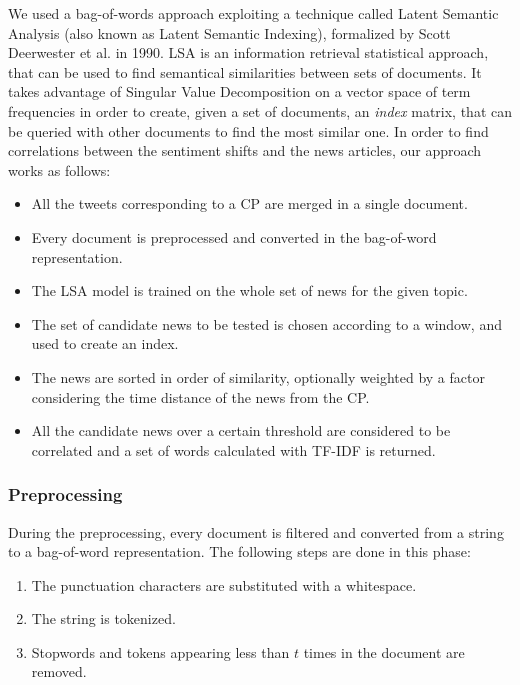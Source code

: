 We used a bag-of-words approach exploiting a technique called Latent Semantic Analysis (also known as Latent Semantic Indexing), formalized by Scott Deerwester et al. in 1990\cite{LSA}. LSA is an information retrieval statistical approach, that can be used to find semantical similarities between sets of documents. It takes advantage of Singular Value Decomposition on a vector space of term frequencies in order to create, given a set of documents, an \emph{index} matrix, that can be queried with other documents to find the most similar one. In order to find correlations between the sentiment shifts and the news articles, our approach works as follows:
\begin{itemize}
\item All the tweets corresponding to a CP are merged in a single document.
\item Every document is preprocessed and converted in the bag-of-word representation.
\item The LSA model is trained on the whole set of news for the given topic.
\item The set of candidate news to be tested is chosen according to a window, and  used to create an index.
\item The news are sorted in order of similarity, optionally weighted by a factor considering the time distance of the news from the CP.
\item All the candidate news over a certain threshold are considered to be correlated and a set of words calculated with TF-IDF is returned.
\end{itemize}

\subsubsection*{Preprocessing}
During the preprocessing, every document is filtered and converted from a string to a bag-of-word representation. The following steps are done in this phase:
\begin{enumerate}
\item The punctuation characters are substituted with a whitespace.
\item The string is tokenized.
\item Stopwords and tokens appearing less than $t$ times in the document are removed.
\end{enumerate}

